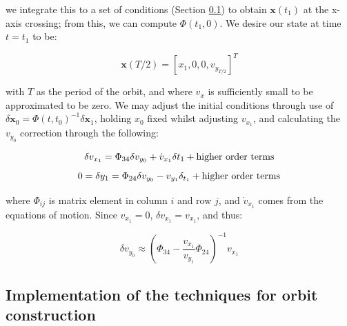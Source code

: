 \noindent we integrate this to a set of conditions (Section \ref{s:haloorbitcomputation}) to obtain $\pmb{x}(t_1)$ at the x-axis crossing; from this, we can compute $\Phi(t_1, 0)$. We desire our state at time $t=t_1$ to be:

\begin{equation}
\pmb{x}(T/2) = \left[x_1, 0, 0, v_{y_{T/2}}\right]^T
\end{equation}

\noindent with $T$ as the period of the orbit, and where $v_x$ is sufficiently small to be approximated to be zero. We may adjust the initial conditions through use of $\delta \pmb{x}_0 = \Phi (t, t_0)^{-1}\delta\pmb{x}_1$, holding $x_0$ fixed whilst adjusting $v_{x_1}$, and calculating the $v_{y_0}$ correction through the following:

\begin{equation}
\delta v_{x_1} = \Phi_{34}\delta v_{y_0} + \dot{v}_{x_1}\delta t_1 + \textnormal{higher order terms}
\end{equation}
\begin{equation}
0 = \delta y_1 = \Phi_{24} \delta v_{y_0} - v_{y_1}\delta_{t_1} + \textnormal{higher order terms}
\end{equation}

\noindent where $\Phi_{ij}$ is matrix element in column $i$ and row $j$, and $\dot{v}_{x_1}$ comes from the equations of motion. Since $v_{x_1} = 0$, $\delta v_{x_1} = v_{x_1}$, and thus:

\begin{equation}
\delta v_{y_0} \approx \left(\Phi_{34} - \frac{v_{x_1}}{v_{y_1}}\Phi_{24} \right)^{-1} v_{x_1}
\end{equation}

\subsection{Implementation of the techniques for orbit construction}\label{s:haloorbitcomputation}

